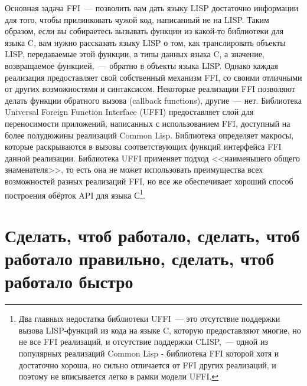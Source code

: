 Основная задача FFI~--- позволить вам дать языку LISP достаточно информации для того, чтобы
прилинковать чужой код, написанный не на LISP. Таким образом, если вы собираетесь вызывать
функции из какой-то библиотеки для языка C, вам нужно рассказать языку LISP о том, как
транслировать объекты LISP, передаваемые этой функции, в типы данных языка C, а значение,
возвращаемое функцией,~--- обратно в объекты языка LISP. Однако каждая реализация
предоставляет свой собственный механизм FFI, со своими отличными от других возможностями и
синтаксисом. Некоторые реализации FFI позволяют делать функции обратного вызова (callback
functions), другие~--- нет. Библиотека Universal Foreign Function Interface (UFFI)
предоставляет слой для переносимости приложений, написанных с использованием FFI,
доступный на более полудюжины реализаций Common Lisp. Библиотека определяет макросы,
которые раскрываются в вызовы соответствующих функций интерфейса FFI данной
реализации. Библиотека UFFI применяет подход <<наименьшего общего знаменателя>>, то есть
она не может использовать преимущества всех возможностей разных реализаций FFI, но все же
обеспечивает хороший способ построения обёрток API для языка С\footnote{Два главных
    недостатка библиотеки UFFI~--- это отсутствие поддержки вызова LISP-функций из кода на
    языке C, которую предоставляют многие, но не все FFI реализаций, и отсутствие
    поддержки CLISP,~--- одной из популярных реализаций Common Lisp - библиотека FFI
    которой хотя и достаточно хороша, но сильно отличается от FFI других реализаций, и
    поэтому не вписывается легко в рамки модели UFFI.}.

\section{Сделать, чтоб работало, сделать, чтоб работало правильно, сделать, чтоб работало быстро}

